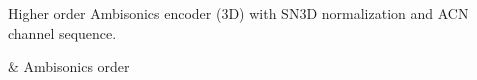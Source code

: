 Higher order Ambisonics encoder (3D) with SN3D normalization and ACN
channel sequence.



\begin{tscattributes}
 & Ambisonics order\\
\end{tscattributes}

